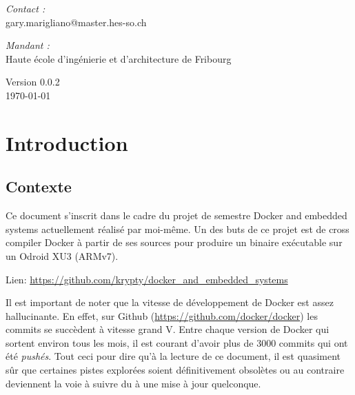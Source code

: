 \documentclass[11pt,a4paper,oneside]{report}
\begin{document}
\begin{titlepage}
\begin{center}
\vfill

\noindent
\begin{minipage}{0.4\textwidth}
  \begin{flushleft} \large
    \emph{Contact :}\\
    gary.marigliano@master.hes-so.ch
  \end{flushleft}
\end{minipage}%
\begin{minipage}{0.4\textwidth}
  \begin{flushright} \large
    \emph{Mandant :} \\
    Haute école d'ingénierie et d'architecture de Fribourg
  \end{flushright}
\end{minipage}

\vfill

{\large Version 0.0.2 \\ \today}

\end{center}
\end{titlepage}

\pagestyle{historystyle}
\begin{versionhistory}  
\end{versionhistory}


\tableofcontents
{}

\pagestyle{normal}

\chapter{Introduction}

\section{Contexte}\label{contexte}

Ce document s'inscrit dans le cadre du projet de semestre Docker and embedded systems actuellement réalisé par moi-même. Un des buts de ce projet est de cross compiler Docker à partir de ses sources pour produire un binaire exécutable sur un Odroid XU3 (ARMv7).

Lien: \url{https://github.com/krypty/docker_and_embedded_systems}

Il est important de noter que la vitesse de développement de Docker est assez hallucinante. En effet, sur Github (\url{https://github.com/docker/docker}) les commits se succèdent à vitesse grand V. Entre chaque version de Docker qui sortent environ tous les mois, il est courant d'avoir plus de 3000 commits qui ont été \emph{pushés}. Tout ceci pour dire qu'à la lecture de ce document, il est quasiment sûr que certaines pistes explorées soient définitivement obsolètes ou au contraire deviennent la voie à suivre du à une mise à jour quelconque.
\end{document}
